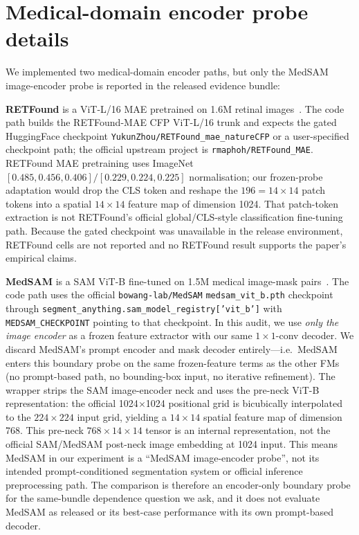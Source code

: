 \section{Medical-domain encoder probe details}
\label{app:medsam-note}

We implemented two medical-domain encoder paths, but only the MedSAM
image-encoder probe is reported in the released evidence bundle:

\textbf{RETFound} is a ViT-L/16 MAE pretrained on 1.6M retinal images~\citep{retfound2023}. The code path builds the RETFound-MAE CFP ViT-L/16 trunk and expects the gated HuggingFace checkpoint \texttt{YukunZhou/RETFound\_mae\_natureCFP} or a user-specified checkpoint path; the official upstream project is \texttt{rmaphoh/RETFound\_MAE}. RETFound MAE pretraining uses ImageNet $[0.485, 0.456, 0.406]/[0.229, 0.224, 0.225]$ normalisation; our frozen-probe adaptation would drop the CLS token and reshape the $196{=}14{\times}14$ patch tokens into a spatial $14{\times}14$ feature map of dimension 1024. That patch-token extraction is not RETFound's official global/CLS-style classification fine-tuning path. Because the gated checkpoint was unavailable in the release environment, RETFound cells are not reported and no RETFound result supports the paper's empirical claims.

\textbf{MedSAM} is a SAM ViT-B fine-tuned on 1.5M medical image-mask pairs~\citep{medsam2024}. The code path uses the official \texttt{bowang-lab/MedSAM} \texttt{medsam\_vit\_b.pth} checkpoint through \texttt{segment\_anything.sam\_model\_registry['vit\_b']} with \texttt{MEDSAM\_CHECKPOINT} pointing to that checkpoint. In this audit, we use \emph{only the image encoder} as a frozen feature extractor with our same $1{\times}1$-conv decoder. We discard MedSAM's prompt encoder and mask decoder entirely---i.e.\ MedSAM enters this boundary probe on the same frozen-feature terms as the other FMs (no prompt-based path, no bounding-box input, no iterative refinement). The wrapper strips the SAM image-encoder neck and uses the pre-neck ViT-B representation: the official 1024$\times$1024 positional grid is bicubically interpolated to the $224{\times}224$ input grid, yielding a $14{\times}14$ spatial feature map of dimension 768. This pre-neck $768{\times}14{\times}14$ tensor is an internal representation, not the official SAM/MedSAM post-neck image embedding at 1024 input. This means MedSAM in our experiment is a ``MedSAM image-encoder probe'', not its intended prompt-conditioned segmentation system or official inference preprocessing path. The comparison is therefore an encoder-only boundary probe for the same-bundle dependence question we ask, and it does not evaluate MedSAM as released or its best-case performance with its own prompt-based decoder.

